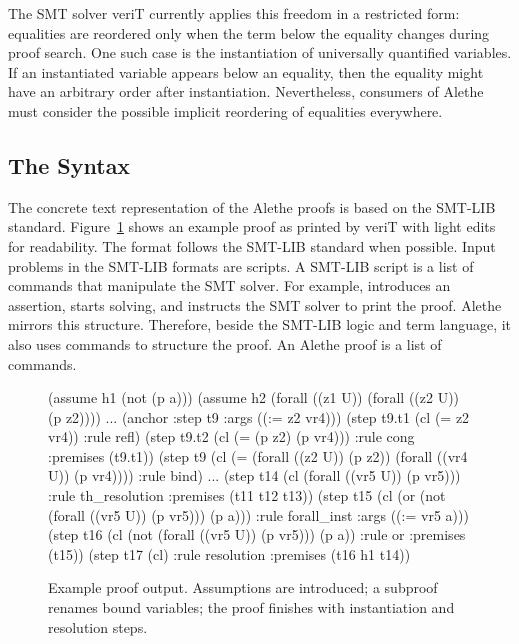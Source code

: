 \documentclass{scrartcl}
\newcommand\smtlib{SMT-LIB}
\newcommand\tool[1]{\textsf{#1}}
\newcommand\verit{\tool{veriT}}
\theoremstyle{definition}
\begin{document}
The SMT solver {\verit} currently applies this freedom in a restricted
form: equalities are reordered only
when the term below the equality changes during proof search. One such
case is the instantiation of universally quantified variables. If an
instantiated variable appears below an equality, then the equality might
have an arbitrary order after instantiation.
Nevertheless, consumers of Alethe must consider the possible
implicit reordering of equalities everywhere.


\subsection{The Syntax}\label{sec:alethe:syntax}

The concrete text representation of the Alethe proofs
is based on the {\smtlib} standard. Figure~\ref{fig:proof_ex} shows an
example proof as printed by {\verit} with light edits for readability.
%
The format follows the {\smtlib} standard when possible.
%
Input problems in the {\smtlib} formats are scripts.  A {\smtlib} script
is a list of commands that manipulate the SMT solver.  For example,
 introduces an assertion,  starts
solving, and  instructs the SMT solver to print the
proof.
%
Alethe mirrors this structure. Therefore, beside the {\smtlib}
logic and term language, it also uses commands to structure the proof.
An Alethe proof is a list of commands.

\begin{figure}[t]
    \begin{AletheVerb}
(assume h1 (not (p a)))
(assume h2 (forall ((z1 U)) (forall ((z2 U)) (p z2))))
...
(anchor :step t9 :args ((:= z2 vr4)))
(step t9.t1 (cl (= z2 vr4)) :rule refl)
(step t9.t2 (cl (= (p z2) (p vr4)))
         :rule cong :premises (t9.t1))
(step t9 (cl (= (forall ((z2 U)) (p z2))
                (forall ((vr4 U)) (p vr4))))
         :rule bind)
...
(step t14 (cl (forall ((vr5 U)) (p vr5)))
          :rule th_resolution :premises (t11 t12 t13))
(step t15 (cl (or (not (forall ((vr5 U)) (p vr5)))
                  (p a)))
          :rule forall_inst :args ((:= vr5 a)))
(step t16 (cl (not (forall ((vr5 U)) (p vr5))) (p a))
          :rule or :premises (t15))
(step t17 (cl) :rule resolution :premises (t16 h1 t14))
    \end{AletheVerb}
\caption{Example proof output. Assumptions are
  introduced;   a subproof renames bound variables; the proof finishes with
  instantiation and resolution steps.}
\label{fig:proof_ex}
\end{figure}
\end{document}
